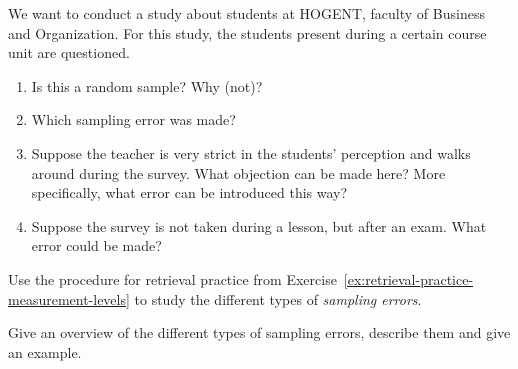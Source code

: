   \begin{exercise}
    We want to conduct a study about students at HOGENT, faculty of Business and Organization.
    For this study, the students present during a certain course unit are questioned.
    
    \begin{enumerate}[label=\alph*.]
      \item Is this a random sample? Why (not)?
      \item Which sampling error was made?
      \item Suppose the teacher is very strict in the students' perception and walks around during the survey. What objection can be made here? More specifically, what error can be introduced this way?
      \item Suppose the survey is not taken during a lesson, but after an exam. What error could be made?
    \end{enumerate}
  \end{exercise}
  
  \begin{exercise}
    Use the procedure for retrieval practice from Exercise~\ref{ex:retrieval-practice-measurement-levels} to study the different types of \emph{sampling errors}.
    
    Give an overview of the different types of sampling errors, describe them and give an example.
  \end{exercise}

